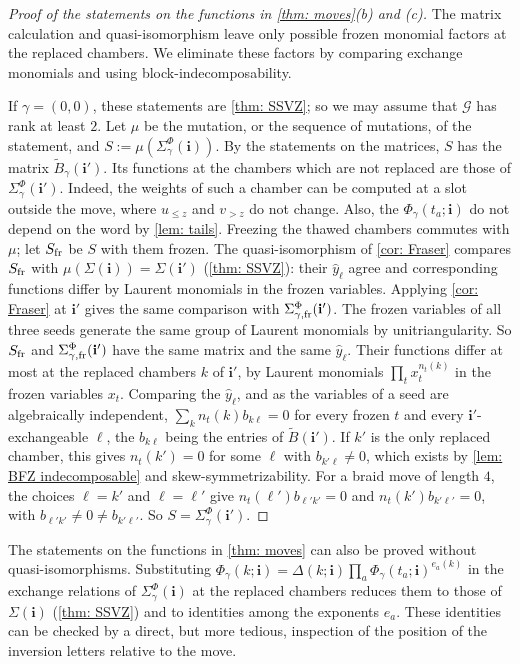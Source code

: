 \documentclass[a4paper]{amsart}
\numberwithin{equation}{section}
\theoremstyle{definition}
\theoremstyle{remark}
\newcommand{\mcG}{\mathcal{G}}
\newcommand{\bfi}{\mathbf{i}}
\newcommand{\tB}{\widetilde{B}}
\begin{document}
\begin{proof}[Proof of the statements on the functions in \cref{thm: moves}(b) and (c)]
The matrix calculation and quasi-isomorphism leave only possible frozen monomial factors at the replaced chambers.
We eliminate these factors by comparing exchange monomials and using block-indecomposability.

  If $\gamma=(0,0)$, these statements are \cref{thm: SSVZ}; so we may assume that $\mcG$ has rank at least $2$.
  Let $\mu$ be the mutation, or the sequence of mutations, of the statement, and $S:=\mu(\Sigma^\Phi_\gamma(\bfi))$.
  By the statements on the matrices, $S$ has the matrix $\tB_\gamma(\bfi')$.
  Its functions at the chambers which are not replaced are those of $\Sigma^\Phi_\gamma(\bfi')$.
  Indeed, the weights of such a chamber can be computed at a slot outside the move, where $u_{\le z}$ and $v_{>z}$ do not change.
  Also, the $\Phi_\gamma(t_a;\bfi)$ do not depend on the word by \cref{lem: tails}.
  Freezing the thawed chambers commutes with $\mu$; let $S_{\rm fr}$ be $S$ with them frozen.
  The quasi-isomorphism of \cref{cor: Fraser} compares $S_{\rm fr}$ with $\mu(\Sigma(\bfi))=\Sigma(\bfi')$ (\cref{thm: SSVZ}): their $\hat y_\ell$ agree and corresponding functions differ by Laurent monomials in the frozen variables.
  Applying \cref{cor: Fraser} at $\bfi'$ gives the same comparison with $\Sigma^\Phi_{\gamma,\rm fr}(\bfi')$. The frozen variables of all three seeds generate the same group of Laurent monomials by unitriangularity.
  So $S_{\rm fr}$ and $\Sigma^\Phi_{\gamma,\rm fr}(\bfi')$ have the same matrix and the same $\hat y_\ell$.
  Their functions differ at most at the replaced chambers $k$ of $\bfi'$, by Laurent monomials $\prod_tx_t^{n_t(k)}$ in the frozen variables $x_t$.
  Comparing the $\hat y_\ell$, and as the variables of a seed are algebraically independent, $\sum_k n_t(k)b_{k\ell}=0$ for every frozen $t$ and every $\bfi'$-exchangeable $\ell$, the $b_{k\ell}$ being the entries of $\tB(\bfi')$.
  If $k'$ is the only replaced chamber, this gives $n_t(k')=0$ for some $\ell$ with $b_{k'\ell}\neq0$, which exists by \cref{lem: BFZ indecomposable} and skew-symmetrizability.
  For a braid move of length $4$, the choices $\ell=k'$ and $\ell=\ell'$ give $n_t(\ell')b_{\ell'k'}=0$ and $n_t(k')b_{k'\ell'}=0$, with $b_{\ell'k'}\neq0\neq b_{k'\ell'}$.
  So $S=\Sigma^\Phi_\gamma(\bfi')$.
\end{proof}

\begin{remark}
  The statements on the functions in \cref{thm: moves} can also be proved without quasi-isomorphisms.
  Substituting $\Phi_\gamma(k;\bfi)=\Delta(k;\bfi)\prod_a\Phi_\gamma(t_a;\bfi)^{e_a(k)}$ in the exchange relations of $\Sigma^\Phi_\gamma(\bfi)$ at the replaced chambers reduces them to those of $\Sigma(\bfi)$ (\cref{thm: SSVZ}) and to identities among the exponents $e_a$. These identities can be checked by a direct, but more tedious, inspection of the position of the inversion letters relative to the move.
\end{remark}
\end{document}

